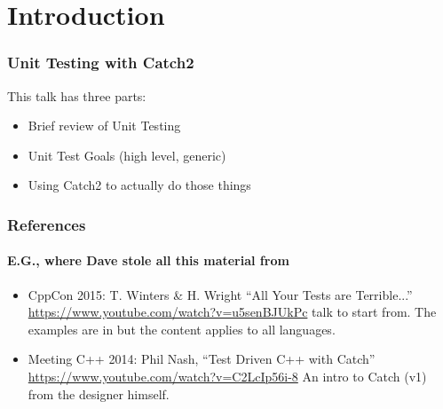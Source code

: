 \section{Introduction}

\begin{frame}[fragile]
\frametitle{Unit Testing with Catch2}

This talk has three parts:

\begin{itemize}
\item Brief review of Unit Testing
\item Unit Test Goals (high level, generic)
\item Using Catch2 to actually do those things
\end{itemize}

\end{frame}


\begin{frame}[fragile]
\frametitle{References}
\framesubtitle{E.G., where Dave stole all this material from}

\begin{itemize}
\item CppCon 2015: T. Winters \& H. Wright ``All Your Tests are Terrible...''
  \url{https://www.youtube.com/watch?v=u5senBJUkPc}
   talk to start from.  The examples are in \CC but the
  content applies to all languages.
\vskip 6pt
\item Meeting C++ 2014: Phil Nash, ``Test Driven C++ with Catch''
  \url{https://www.youtube.com/watch?v=C2LcIp56i-8} An intro to Catch
  (v1) from the designer himself.

\end{itemize}

\end{frame}


